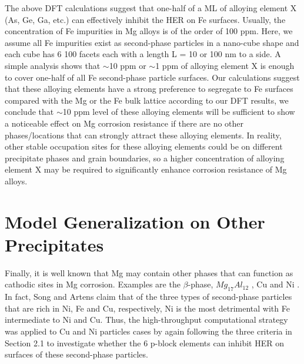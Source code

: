 The above DFT calculations suggest that one-half of a \ac{ML} of alloying element X (As, Ge, Ga, etc.) can effectively inhibit the HER on Fe surfaces. Usually, the concentration of Fe impurities in Mg alloys is of the order of 100 ppm. Here, we assume all Fe impurities exist as second-phase particles in a nano-cube shape and each cube has 6 {100} facets each with a length L = 10 or 100 nm to a side. A simple analysis shows that $\sim$10 ppm or $\sim$1 ppm of alloying element X is enough to cover one-half of all Fe second-phase particle surfaces. Our calculations suggest that these alloying elements have a strong preference to segregate to Fe surfaces compared with the Mg or the Fe bulk lattice according to our DFT results, we conclude that $\sim$10 ppm level of these alloying elements will be sufficient to show a noticeable effect on Mg corrosion resistance if there are no other phases/locations that can strongly attract these alloying elements. In reality, other stable occupation sites for these alloying elements could be on different precipitate phases and grain boundaries, so a higher concentration of alloying element X may be required to significantly enhance corrosion resistance of Mg alloys.

\section{Model Generalization on Other Precipitates}

Finally, it is well known that Mg may contain other phases that can function as cathodic sites in Mg corrosion. Examples are the $\beta$-phase, $Mg_{17}Al_{12}$ \cite{guo2017influence}, Cu \cite{kawabata2012influence} and Ni \cite{hanawalt1942corrosion}. In fact, Song and Artens \cite{song2003understanding} claim that of the three types of second-phase particles that are rich in Ni, Fe and Cu, respectively, Ni is the most detrimental with Fe intermediate to Ni and Cu. Thus, the high-throughput computational strategy was applied to Cu and Ni particles cases by again following the three criteria in Section 2.1 to investigate whether the 6 p-block elements can inhibit HER on surfaces of these second-phase particles. 

